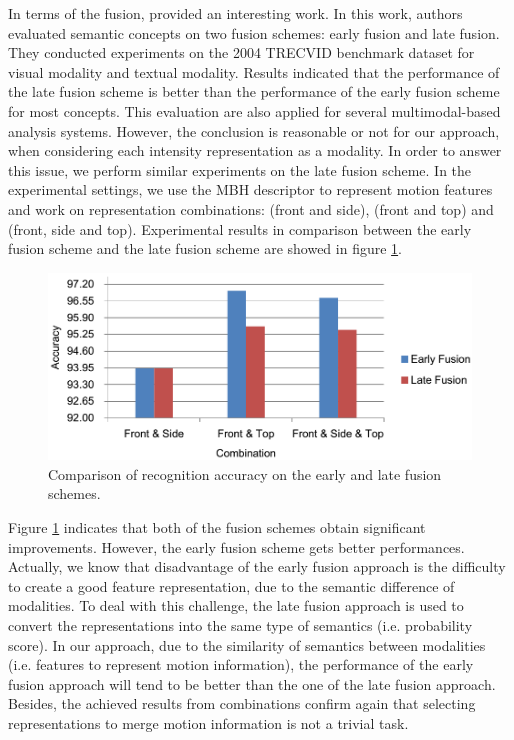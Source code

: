\documentclass[review]{elsarticle}
\begin{document}
In terms of the fusion, \cite{snoek2005early} provided an interesting work. In this work, authors evaluated semantic concepts on two fusion schemes: early fusion and late fusion. They conducted experiments on the 2004 TRECVID benchmark dataset for visual modality and textual modality. Results indicated that the performance of the late fusion scheme is better than the performance of the early fusion scheme for most concepts. This evaluation are also applied for several multimodal-based analysis systems. However, the conclusion is reasonable or not for our approach, when considering each intensity representation as a modality. In order to answer this issue, we perform similar experiments on the late fusion scheme. In the experimental settings, we use the MBH descriptor to represent motion features and work on representation combinations: (front and side), (front and top) and (front, side and top). Experimental results in comparison between the early fusion scheme and the late fusion scheme are showed in figure \ref{lbl:Figure_EarlyLateFusion}.

\begin{figure}[H]
    \centering
    \includegraphics[width=\textwidth]{Chart_EarlyLateFusion.eps}
	\caption{\label{lbl:Figure_EarlyLateFusion}Comparison of recognition accuracy on the early and late fusion schemes.}
\end{figure}

Figure \ref{lbl:Figure_EarlyLateFusion} indicates that both of the fusion schemes obtain significant improvements. However, the early fusion scheme gets better performances. Actually, we know that disadvantage of the early fusion approach is the difficulty to create a good feature representation, due to the semantic difference of modalities. To deal with this challenge, the late fusion approach is used to convert the representations into the same type of semantics (i.e. probability score). In our approach, due to the similarity of semantics between modalities (i.e. features to represent motion information), the performance of the early fusion approach will tend to be better than the one of the late fusion approach. Besides, the achieved results from combinations confirm again that selecting representations to merge motion information is not a trivial task.
\end{document}
